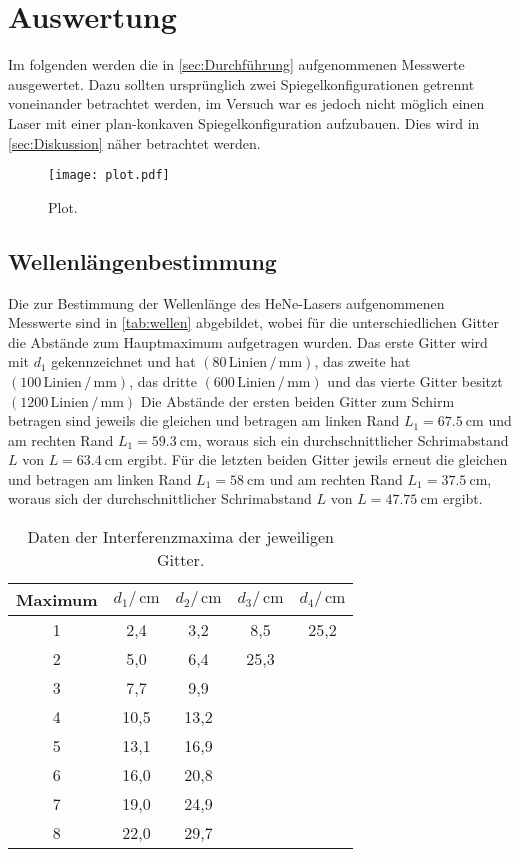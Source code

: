 \section{Auswertung}
\label{sec:Auswertung}
Im folgenden werden die in \autoref{sec:Durchführung} aufgenommenen Messwerte ausgewertet. Dazu sollten ursprünglich zwei Spiegelkonfigurationen getrennt
voneinander betrachtet werden, im Versuch war es jedoch nicht möglich einen Laser mit einer plan-konkaven Spiegelkonfiguration aufzubauen. Dies wird in \autoref{sec:Diskussion} näher betrachtet werden.


\begin{figure}
  \centering
  \texttt{[image: plot.pdf]}
  \caption{Plot.}
  \label{fig:plot}
\end{figure}

\subsection{Wellenlängenbestimmung}
\label{subsec:wellen}

Die zur Bestimmung der Wellenlänge des HeNe-Lasers aufgenommenen Messwerte sind in \autoref{tab:wellen} abgebildet, wobei für die unterschiedlichen Gitter die Abstände zum Hauptmaximum aufgetragen wurden.
Das erste Gitter wird mit $d_1$ gekennzeichnet und hat $(80\, \text{Linien}\,/\,\si{\milli\meter})$, das zweite hat $(100\, \text{Linien}\,/\,\si{\milli\meter})$, das dritte $(600\, \text{Linien}\,/\,\si{\milli\meter})$ und das
vierte Gitter besitzt $(1200\, \text{Linien}\,/\,\si{\milli\meter})$
Die Abstände der ersten beiden Gitter zum Schirm betragen sind jeweils die gleichen und betragen am linken Rand $L_1=\SI{67.5}{\centi\meter}$ und am rechten Rand $L_1=\SI{59.3}{\centi\meter}$, woraus sich ein
durchschnittlicher Schrimabstand $L$ von $L=\SI{63.4}{\centi\meter}$ ergibt.
Für die letzten beiden Gitter jewils erneut die gleichen und betragen am linken Rand $L_1=\SI{58}{\centi\meter}$ und am rechten Rand $L_1=\SI{37.5}{\centi\meter}$, woraus sich der
durchschnittlicher Schrimabstand $L$ von $L=\SI{47.75}{\centi\meter}$ ergibt.


\begin{table}[H]
  \centering
  \caption{Daten der Interferenzmaxima der jeweiligen Gitter.}
  \label{tab:wellen}
  \begin{tabular}{c c c c c}
      \toprule
      Maximum & $d_1/\,\si{\centi\meter}$ & $d_2/\,\si{\centi\meter}$ & $d_3/\,\si{\centi\meter}$ & $d_4/\,\si{\centi\meter}$ \\
      \midrule
      1 & 2,4 & 3,2 & 8,5 & 25,2\\  
      2 & 5,0 & 6,4 & 25,3 &    \\  
      3 & 7,7 & 9,9 &       &   \\  
      4 & 10,5 & 13,2 &     &   \\
      5 & 13,1 & 16,9 &     &   \\
      6 & 16,0 & 20,8 &     &   \\
      7 & 19,0 & 24,9 &     &   \\
      8 & 22,0 & 29,7 &     &   \\
      \bottomrule
  \end{tabular}
\end{table}

